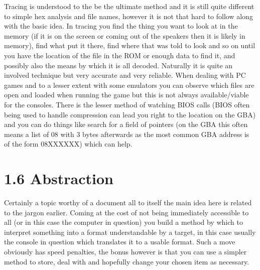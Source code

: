 \documentclass[
]{book}
\begin{document}
Tracing is understood to the be the ultimate method and it is still quite different to simple hex analysis and file names, however it is not that hard to follow along with the basic idea. In tracing you find the thing you want to look at in the memory (if it is on the screen or coming out of the speakers then it is likely in memory), find what put it there, find where that was told to look and so on until you have the location of the file in the ROM or enough data to find it, and possibly also the means by which it is all decoded. Naturally it is quite an involved technique but very accurate and very reliable. When dealing with PC games and to a lesser extent with some emulators you can observe which files are open and loaded when running the game but this is not always available/viable for the consoles. There is the lesser method of watching BIOS calls (BIOS often being used to handle compression can lead you right to the location on the GBA) and you can do things like search for a field of pointers (on the GBA this often means a list of 08 with 3 bytes afterwards as the most common GBA address is of the form 08XXXXXX) which can help.

\hypertarget{abstraction}{%
\section{1.6 Abstraction}\label{abstraction}}

Certainly a topic worthy of a document all to itself the main idea here is related to the jargon earlier. Coming at the cost of not being immediately accessible to all (or in this case the computer in question) you build a method by which to interpret something into a format understandable by a target, in this case usually the console in question which translates it to a usable format. Such a move obviously has speed penalties, the bonus however is that you can use a simpler method to store, deal with and hopefully change your chosen item as necessary.
\end{document}
